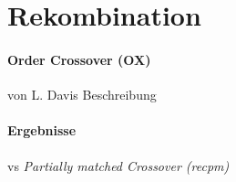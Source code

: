 \section{Rekombination}\label{recombination}


\paragraph{Order Crossover (OX)} von L. Davis
Beschreibung

\paragraph{Ergebnisse}
vs \emph{Partially matched Crossover (recpm)}

